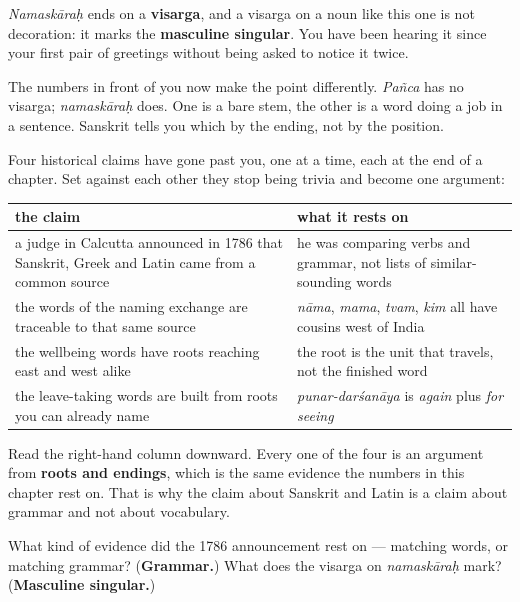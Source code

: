 \begin{culture}
\emph{Namaskāraḥ} ends on a \textbf{visarga}, and a visarga on a noun like this one is not decoration: it marks the \textbf{masculine singular}. You have been hearing it since your first pair of greetings without being asked to notice it twice.

The numbers in front of you now make the point differently. \emph{Pañca} has no visarga; \emph{namaskāraḥ} does. One is a bare stem, the other is a word doing a job in a sentence. Sanskrit tells you which by the ending, not by the position.
\end{culture}

\begin{tcolorbox}[breakable,skin=enhanced,colback=violet!6,colframe=violet!45!black,boxrule=0.5pt,arc=1mm,left=6pt,right=6pt,top=4pt,bottom=4pt,fonttitle=\bfseries,title={Across the family}]
Four historical claims have gone past you, one at a time, each at the end of a chapter. Set against each other they stop being trivia and become one argument:

\noindent
\begin{tabularx}{\linewidth}{@{}>{\raggedright\arraybackslash}X>{\raggedright\arraybackslash}X@{}}
\toprule
\textbf{the claim} & \textbf{what it rests on} \\
\midrule
a judge in Calcutta announced in 1786 that Sanskrit, Greek and Latin came from a common source & he was comparing verbs and grammar, not lists of similar-sounding words \\
the words of the naming exchange are traceable to that same source & \emph{nāma}, \emph{mama}, \emph{tvam}, \emph{kim} all have cousins west of India \\
the wellbeing words have roots reaching east and west alike & the root is the unit that travels, not the finished word \\
the leave-taking words are built from roots you can already name & \emph{punar-darśanāya} is \emph{again} plus \emph{for seeing} \\
\bottomrule
\end{tabularx}

Read the right-hand column downward. Every one of the four is an argument from \textbf{roots and endings}, which is the same evidence the numbers in this chapter rest on. That is why the claim about Sanskrit and Latin is a claim about grammar and not about vocabulary.
\end{tcolorbox}

\begin{tcolorbox}[breakable,colback=teal!4,colframe=teal!35!black,title={Before you move on}]
What kind of evidence did the 1786 announcement rest on — matching words, or matching grammar? (\textbf{Grammar.}) What does the visarga on \emph{namaskāraḥ} mark? (\textbf{Masculine singular.})
\end{tcolorbox}
